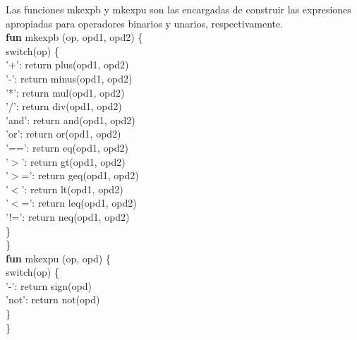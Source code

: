 \documentclass[\main/MemoriaPL.tex]{subfiles}
\begin{document}
    \bigskip
    \par
    Las funciones mkexpb y mkexpu son las encargadas de construir las expresiones
    apropiadas para operadores binarios y unarios, respectivamente.\\
    \vspace{2mm}
    \textbf{fun} mkexpb (op, opd1, opd2) \{\\
    \hspace{5mm}switch(op) \{\\
    \hspace{10mm}'+': return plus(opd1, opd2)\\
    \hspace{10mm}'-': return minus(opd1, opd2)\\
    \hspace{10mm}'*': return mul(opd1, opd2)\\
    \hspace{10mm}'/': return div(opd1, opd2)\\
    \hspace{10mm}'and': return and(opd1, opd2)\\
    \hspace{10mm}'or': return or(opd1, opd2)\\
    \hspace{10mm}'==': return eq(opd1, opd2)\\
    \hspace{10mm}'$>$': return gt(opd1, opd2)\\
    \hspace{10mm}'$>$=': return geq(opd1, opd2)\\
    \hspace{10mm}'$<$': return lt(opd1, opd2)\\
    \hspace{10mm}'$<$=': return leq(opd1, opd2)\\
    \hspace{10mm}'!=': return neq(opd1, opd2)\\
    \hspace{5mm}\}\\
    \}\\
    \vspace{2mm}
    \textbf{fun} mkexpu (op, opd) \{\\
    \hspace{5mm}switch(op) \{\\
    \hspace{10mm}'-': return sign(opd)\\
    \hspace{10mm}'not': return not(opd)\\
    \hspace{5mm}\}\\
    \}\\
\end{document}
